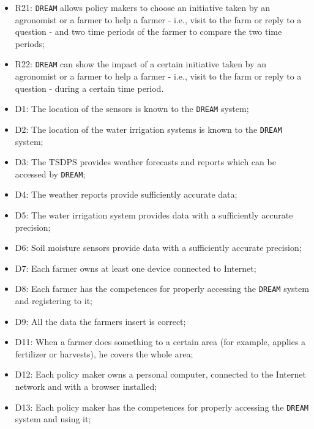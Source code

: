 \documentclass{article}
\begin{document}
\begin{itemize}
    \item R21: \verb|DREAM| allows policy makers to choose an initiative taken by an agronomist or a farmer to help a farmer - i.e., visit to the farm or reply to a question - and two time periods of the farmer to compare the two time periods;

    \item R22: \verb|DREAM| can show the impact of a certain initiative taken by an agronomist or a farmer to help a farmer - i.e., visit to the farm or reply to a question - during a certain time period.
    
    \item D1: The location of the sensors is known to the \verb|DREAM| system;
    
    \item D2: The location of the water irrigation systems is known to the \verb|DREAM| system;
    
    \item D3: The TSDPS provides weather forecasts and reports which can be accessed by \verb|DREAM|;
    
    \item D4: The weather reports provide sufficiently accurate data;
    
    \item D5: The water irrigation system provides data with a sufficiently accurate precision;
    
    \item D6: Soil moisture sensors provide data with a sufficiently accurate precision;
    
    \item D7: Each farmer owns at least one device connected to Internet;
    
    \item D8: Each farmer has the competences for properly accessing the \verb|DREAM| system and registering to it;
    
    \item D9: All the data the farmers insert is correct;
    
    \item D11: When a farmer does something to a certain area (for example, applies a fertilizer or harvests), he covers the whole area;
    
    \item D12: Each policy maker owns a personal computer, connected to the Internet network and with a browser installed;
    
    \item D13: Each policy maker has the competences for properly accessing the \verb|DREAM| system and using it;
    

\end{itemize}
\end{document}
